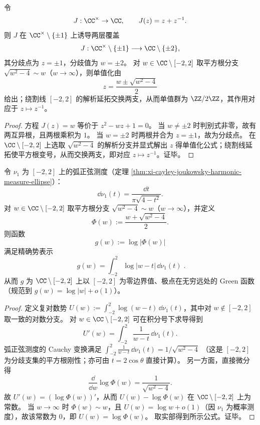 \begin{proposition}\label{prop:xi-joukowsky-double-cover-uniformization}
令
\[
J:\CC^\times\to\CC,\qquad J(z)=z+z^{-1}.
\]
则 \(J\) 在 \(\CC^\times\setminus\{\pm 1\}\) 上诱导两层覆盖
\[
J:\CC^\times\setminus\{\pm 1\}\longrightarrow \CC\setminus\{\pm 2\},
\]
其分歧点为 \(z=\pm 1\)，分歧值为 \(w=\pm 2\)。
对 \(w\in\CC\setminus[-2,2]\) 取平方根分支 \(\sqrt{w^2-4}\sim w\)（\(w\to\infty\)），则单值化由
\[
z=\frac{w\pm\sqrt{w^2-4}}{2}
\]
给出；绕割线 \([-2,2]\) 的解析延拓交换两支，从而单值群为 \(\ZZ/2\ZZ\)，其作用对应于 \(z\mapsto z^{-1}\)。
\end{proposition}
\begin{proof}
方程 \(J(z)=w\) 等价于 \(z^2-wz+1=0\)。
当 \(w\neq\pm 2\) 时判别式非零，故有两互异根，且两根乘积为 \(1\)。
当 \(w=\pm2\) 时两根并合为 \(z=\pm1\)，故为分歧点。
在 \(\CC\setminus[-2,2]\) 上选取 \(\sqrt{w^2-4}\) 的解析分支并显式解出 \(z\) 得单值化公式；绕割线延拓使平方根变号，从而交换两支，即对应 \(z\mapsto z^{-1}\)。证毕。
\end{proof}

\begin{proposition}\label{prop:xi-singular-ring-green-potential-closed}
令 \(\nu_1\) 为 \([-2,2]\) 上的弧正弦测度（定理 \ref{thm:xi-cayley-joukowsky-harmonic-measure-ellipse}）：
\[
\dd\nu_1(t)=\frac{\dd t}{\pi\sqrt{4-t^2}}.
\]
对 \(w\in\CC\setminus[-2,2]\) 取平方根分支 \(\sqrt{w^2-4}\sim w\)（\(w\to\infty\)），并定义
\[
\Phi(w):=\frac{w+\sqrt{w^2-4}}{2}.
\]
则函数
\[
g(w):=\log|\Phi(w)|
\]
满足精确势表示
\[
\boxed{\;
g(w)=\int_{-2}^{2}\log|w-t|\,\dd\nu_1(t)\; } .
\]
从而 \(g\) 为 \(\CC\setminus[-2,2]\) 上以 \([-2,2]\) 为零边界值、极点在无穷远处的 Green 函数（规范到 \(g(w)=\log|w|+o(1)\)）。
\end{proposition}
\begin{proof}
定义复对数势
\(
U(w):=\int_{-2}^{2}\log(w-t)\,\dd\nu_1(t)
\)，其中对 \(w\notin[-2,2]\) 取一致的对数分支。
对 \(w\in\CC\setminus[-2,2]\) 可在积分号下求导得到
\[
U'(w)=\int_{-2}^{2}\frac{1}{w-t}\,\dd\nu_1(t).
\]
弧正弦测度的 Cauchy 变换满足
\(
\int_{-2}^{2}\frac{1}{w-t}\,\dd\nu_1(t)=1/\sqrt{w^2-4}
\)
（这是 \([-2,2]\) 为分歧支集的平方根刚性；亦可由 \(t=2\cos\theta\) 直接计算）。
另一方面，直接微分得
\[
\frac{\dd}{\dd w}\log\Phi(w)=\frac{1}{\sqrt{w^2-4}}.
\]
故 \(U'(w)=(\log\Phi(w))'\)，从而 \(U(w)-\log\Phi(w)\) 在 \(\CC\setminus[-2,2]\) 上为常数。
当 \(w\to\infty\) 时 \(\Phi(w)\sim w\)，且 \(U(w)=\log w+o(1)\)（因 \(\nu_1\) 为概率测度），故该常数为 \(0\)，即 \(U(w)=\log\Phi(w)\)。
取实部得到所示公式。证毕。
\end{proof}


